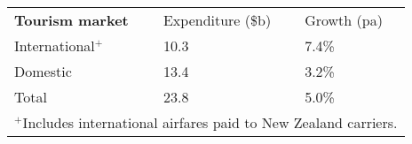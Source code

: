 \begin{tabular}[t]{p{4.45cm}>{\hfill}p{1.7cm}>{\hfill}p{1.35cm}}
 \textbf{Tourism market} & Expenditure (\$b) & Growth (pa) \\ 
 International$^+$ & 10.3 & 7.4\% \\ 
  Domestic & 13.4 & 3.2\% \\ 
  Total & 23.8 & 5.0\% \\ 
  \multicolumn{3}{p{7.5cm}}{$^+$Includes international airfares paid to New Zealand carriers.}\ 
\end{tabular}
